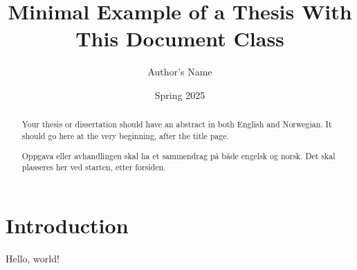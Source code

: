 \documentclass[master,USenglish]{thesis}
\title{Minimal Example of a Thesis With This Document Class}
\author{Author's Name}
\date{Spring 2025}
\begin{document}
\maketitle

\frontmatter

\begin{abstract}

Your thesis or dissertation should have an abstract in both English and Norwegian. It should go here at the very beginning, after the title page.

\end{abstract}

\begin{otherlanguage}{norsk}
\begin{abstract}

Oppgava eller avhandlingen skal ha et sammendrag på både engelsk og norsk. Det skal plasseres her ved starten, etter forsiden.

\end{abstract}
\end{otherlanguage}

\tableofcontents

\mainmatter

\chapter{Introduction}

Hello, world!
\end{document}
